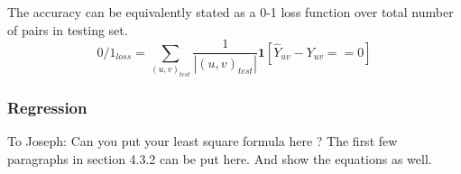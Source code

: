 	The accuracy can be equivalently stated as a 0-1 loss function over total number of pairs in testing set.
	\begin{equation}
		0/1_{loss} = \sum_{(u, v)_{test}} \frac{1}{|(u,v)_{test}|} \textbf{1}[\hat{Y}_{uv} - Y_{uv} == 0]
	\end{equation}
	
	\subsubsection{Regression}
	To Joseph: Can you put your least square formula here ? The first few paragraphs in section 4.3.2 can be put here. And show the equations as well.

